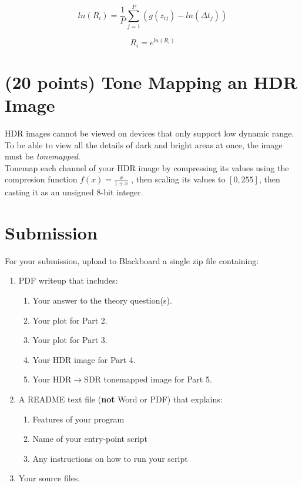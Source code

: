 \documentclass[12pt]{article}
\begin{document}
\begin{equation}
ln(R_i) = \frac{1}{P} \sum_{j=1}^P(g(z_{ij})-ln(\Delta t_j))
\end{equation}

\begin{equation}
R_i = e^{ln(R_i)}
\end{equation}

\newpage

\section{(20 points) Tone Mapping an HDR Image}
HDR images cannot be viewed on devices that only support low dynamic range. To be able to view all the details of dark and bright areas at once, the image must be \emph{tonemapped}. \\

\noindent
Tonemap each channel of your HDR image by compressing its values using the compresion function $f(x)=\frac{x}{1+x}$ , then scaling its values to $[0,255]$, then casting it as an unsigned 8-bit integer. 

\newpage
\section*{Submission}
For your submission, upload to Blackboard a single zip file containing:

\begin{enumerate}
\item PDF writeup that includes:
\begin{enumerate}
\item Your answer to the theory question(s).
\item Your plot for Part 2.
\item Your plot for Part 3.
\item Your HDR image for Part 4.
\item Your HDR$\rightarrow$SDR tonemapped image for Part 5.
\end{enumerate}
\item A README text file (\textbf{not} Word or PDF) that explains:
\begin{enumerate}
\item Features of your program
\item Name of your entry-point script
\item Any instructions on how to run your script
\end{enumerate}
\item Your source files.
\end{enumerate}
\end{document}
